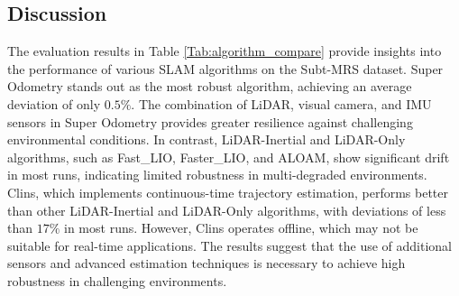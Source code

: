 \documentclass[10pt,twocolumn,letterpaper]{article}
\begin{document}
\subsection{Discussion}
The evaluation results in Table \ref{Tab:algorithm_compare} provide insights into the performance of various SLAM algorithms on the Subt-MRS dataset. Super Odometry stands out as the most robust algorithm, achieving an average deviation of only $0.5\%$. The combination of LiDAR, visual camera, and IMU sensors in Super Odometry provides greater resilience against challenging environmental conditions. In contrast, LiDAR-Inertial and LiDAR-Only algorithms, such as Fast\_LIO, Faster\_LIO, and ALOAM, show significant drift in most runs, indicating limited robustness in multi-degraded environments. Clins, which implements continuous-time trajectory estimation, performs better than other LiDAR-Inertial and LiDAR-Only algorithms, with deviations of less than $17\%$ in most runs. However, Clins operates offline, which may not be suitable for real-time applications. The results suggest that the use of additional sensors and advanced estimation techniques is necessary to achieve high robustness in challenging environments.


\end{document}
